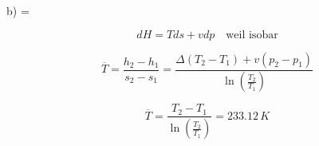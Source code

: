 b) \quad {} = 

\[
dH = T ds + v dp \quad \text{weil isobar}
\]

\[
\overline{T} = \frac{h_2 - h_1}{s_2 - s_1} = \frac{\Delta \left( T_2 - T_1 \right) + v \left( p_2 - p_1 \right)}{\ln \left( \frac{T_2}{T_1} \right)}
\]

\[
\overline{T} = \frac{T_2 - T_1}{\ln \left( \frac{T_2}{T_1} \right)} = 233.12 \, K
\]